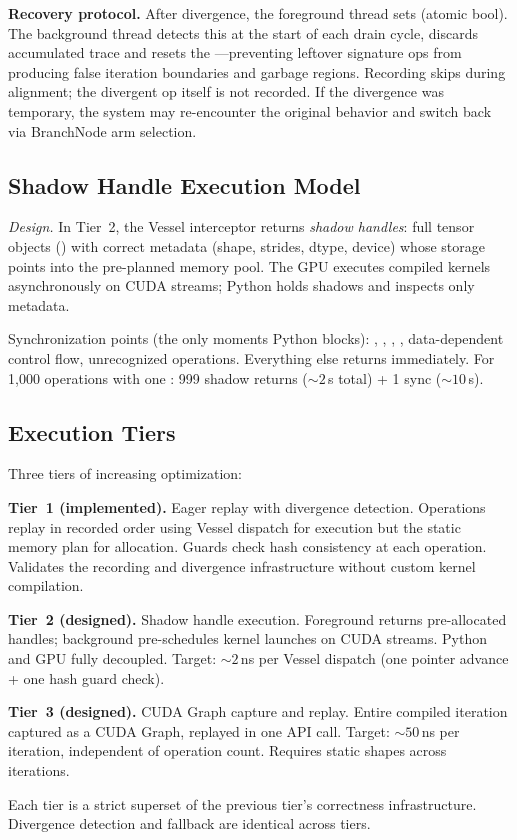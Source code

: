 \textbf{Recovery protocol.}
After divergence, the foreground thread sets  (atomic bool).
The background thread detects this at the start of each drain cycle, discards accumulated trace and resets the ---preventing leftover signature ops from producing false iteration boundaries and garbage regions.
Recording skips during alignment; the divergent op itself is not recorded.
If the divergence was temporary, the system may re-encounter the original behavior and switch back via BranchNode arm selection.

\subsection{Shadow Handle Execution Model}

\emph{Design.}
In Tier~2, the Vessel interceptor returns \emph{shadow handles}: full tensor objects () with correct metadata (shape, strides, dtype, device) whose storage points into the pre-planned memory pool.
The GPU executes compiled kernels asynchronously on CUDA streams; Python holds shadows and inspects only metadata.

Synchronization points (the only moments Python blocks): , , , , data-dependent control flow, unrecognized operations.
Everything else returns immediately.
For 1,000 operations with one : 999 shadow returns (${\sim}2$\,\textmu{}s total) + 1 sync (${\sim}10$\,\textmu{}s).

\subsection{Execution Tiers}

Three tiers of increasing optimization:

\textbf{Tier~1 (implemented).}
Eager replay with divergence detection.
Operations replay in recorded order using Vessel dispatch for execution but the static memory plan for allocation.
Guards check hash consistency at each operation.
Validates the recording and divergence infrastructure without custom kernel compilation.

\textbf{Tier~2 (designed).}
Shadow handle execution.
Foreground returns pre-allocated handles; background pre-schedules kernel launches on CUDA streams.
Python and GPU fully decoupled.
Target: ${\sim}2$\,ns per Vessel dispatch (one pointer advance + one hash guard check).

\textbf{Tier~3 (designed).}
CUDA Graph capture and replay.
Entire compiled iteration captured as a CUDA Graph, replayed in one API call.
Target: ${\sim}50$\,ns per iteration, independent of operation count.
Requires static shapes across iterations.

Each tier is a strict superset of the previous tier's correctness infrastructure.
Divergence detection and fallback are identical across tiers.
